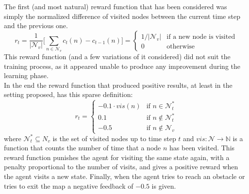 \documentclass[a4paper]{article}
\begin{document}
The first (and most natural) reward function that has been considered was simply the normalized difference of visited nodes between the current time step and the previous one. 
\begin{equation}
    r_t = \frac{1}{|\mathcal{N}_v|} \Big [ \sum_{n \in \mathcal{N}_v} c_t(n) - c_{t-1}(n) \Big ] = \begin{cases}
    1/|\mathcal{N}_v| & \text{if a new node is visited} \\
    0 & \text{otherwise}
    \label{eq:rt1}
    \end{cases}
\end{equation}
This reward function (and a few variations of it considered) did not suit the training process, as it appeared unable to produce any improvement during the learning phase.\\
In the end the reward function that produced positive results, at least in the setting proposed, has this sparse definition:
\begin{equation}
    r_t = \begin{cases}
    -0.1 \cdot vis(n) & \text{if } n \in \mathcal{N}^*_t \\
    0.1 & \text{if } n \notin \mathcal{N}^*_t \\
    -0.5 & \text{if } n \notin \mathcal{N}_v
    \label{eq:rt2}
    \end{cases}
\end{equation}
where $\mathcal{N}^*_t \subseteq N_v$ is the set of visited nodes up to time step $t$ and $vis : \mathcal{N} \to \mathbb{N}$ is a function that counts the number of time that a node $n$ has been visited. This reward function punishes the agent for visiting the same state again, with a penalty proportional to the number of visits, and gives a positive reward when the agent visits a new state. Finally, when the agent tries to reach an obstacle or tries to exit the map a negative feedback of $-0.5$ is given.
\end{document}

